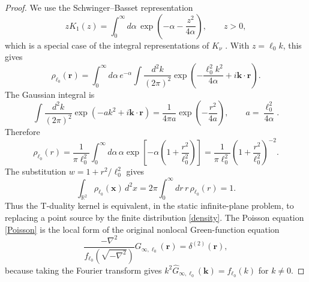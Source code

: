 \documentclass[nopacs,amsmath,amsfonts,amssymb,aps,superscriptaddress]{revtex4}
\begin{document}
\begin{proof}
We use the Schwinger--Basset representation
\begin{equation}
  zK_1(z)=\int_0^\infty d\alpha\,
  \exp\left(-\alpha-\frac{z^2}{4\alpha}\right),
  \qquad z>0,
\end{equation}
which is a special case of the integral representations of $K_\nu$ \cite{DLMF}. With $z=\ell_0 k$, this gives
\begin{equation}
  \rho_{\ell_0}(\mathbf r)
  =\int_0^\infty d\alpha\,e^{-\alpha}
  \int\frac{d^2k}{(2\pi)^2}
  \exp\left(-\frac{\ell_0^2k^2}{4\alpha}+i\mathbf k\cdot\mathbf r\right).
\end{equation}
The Gaussian integral is
\begin{equation}\label{GE}
  \int\frac{d^2 k}{(2\pi)^2}\exp\left(-a k^2+i\mathbf k\cdot\mathbf r\right)
  =\frac{1}{4\pi a}\exp\left(-\frac{r^2}{4a}\right),
  \qquad a=\frac{\ell_0^2}{4\alpha}.
\end{equation}
Therefore
\begin{equation}
  \rho_{\ell_0}(r)
  =\frac{1}{\pi\ell_0^2}\int_0^\infty d\alpha\,\alpha
  \exp\left[-\alpha\left(1+\frac{r^2}{\ell_0^2}\right)\right]
  =\frac{1}{\pi\ell_0^2}\left(1+\frac{r^2}{\ell_0^2}\right)^{-2}.
\end{equation}
The substitution $w=1+r^2/\ell_0^2$ gives
\begin{equation}
  \int_{\mathbb R^2}\rho_{\ell_0}(\mathbf x)\,d^2x
  =2\pi\int_0^\infty dr\,r\,\rho_{\ell_0}(r)=1.
\end{equation}
Thus the T-duality kernel is equivalent, in the static infinite-plane problem, to replacing a point source by the finite distribution \eqref{density}. The Poisson equation \eqref{Poisson} is the local form of the original nonlocal Green-function equation
\begin{equation}
  \frac{-\nabla^2}{f_{\ell_0}(\sqrt{-\nabla^2})}G_{\infty,\ell_0}(\mathbf r)
  =\delta^{(2)}(\mathbf r),
\end{equation}
because taking the Fourier transform gives $k^2\widehat G_{\infty,\ell_0}(\mathbf k)=f_{\ell_0}(k)$ for $k\neq 0$.


\end{proof}
\end{document}
